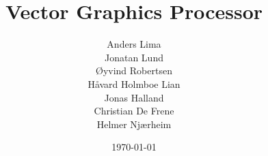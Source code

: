 \newcommand{\mytitle}{Vector Graphics Processor}
\newcommand{\myauthor}{Anders Lima\\Jonatan Lund\\Øyvind Robertsen\\Håvard Holmboe Lian\\Jonas Halland\\Christian De Frene\\Helmer Njærheim}

\title{\mytitle}
\author{\myauthor}
\date{\today}
